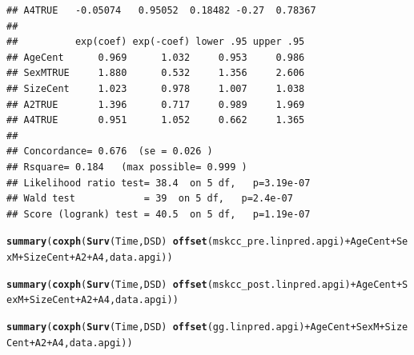 \documentclass{article}\usepackage[]{graphicx}\usepackage[]{color}
\makeatletter
\newcommand{\hlopt}[1]{\textcolor[rgb]{0,0,0}{#1}}%
\newcommand{\hlstd}[1]{\textcolor[rgb]{0.345,0.345,0.345}{#1}}%
\newcommand{\hlkwd}[1]{\textcolor[rgb]{0.737,0.353,0.396}{\textbf{#1}}}%
\newenvironment{kframe}{%
 \def\at@end@of@kframe{}%
 \ifinner\ifhmode%
  \def\at@end@of@kframe{\end{minipage}}%
  \begin{minipage}{\columnwidth}%
 \fi\fi%
 \def\FrameCommand##1{\hskip\@totalleftmargin \hskip-\fboxsep
 \colorbox{shadecolor}{##1}\hskip-\fboxsep
     \hskip-\linewidth \hskip-\@totalleftmargin \hskip\columnwidth}%
 \MakeFramed {\advance\hsize-\width
   \@totalleftmargin\z@ \linewidth\hsize
   \@setminipage}}%
 {\par\unskip\endMakeFramed%
 \at@end@of@kframe}
\newenvironment{knitrout}{}{} %
\makeatother
\begin{document}
\begin{knitrout}
\begin{kframe}
\begin{verbatim}
## A4TRUE   -0.05074   0.95052  0.18482 -0.27  0.78367
## 
##          exp(coef) exp(-coef) lower .95 upper .95
## AgeCent      0.969      1.032     0.953     0.986
## SexMTRUE     1.880      0.532     1.356     2.606
## SizeCent     1.023      0.978     1.007     1.038
## A2TRUE       1.396      0.717     0.989     1.969
## A4TRUE       0.951      1.052     0.662     1.365
## 
## Concordance= 0.676  (se = 0.026 )
## Rsquare= 0.184   (max possible= 0.999 )
## Likelihood ratio test= 38.4  on 5 df,   p=3.19e-07
## Wald test            = 39  on 5 df,   p=2.4e-07
## Score (logrank) test = 40.5  on 5 df,   p=1.19e-07
\end{verbatim}
\begin{alltt}
\hlkwd{summary}\hlstd{(}\hlkwd{coxph}\hlstd{(}\hlkwd{Surv}\hlstd{(Time, DSD)} \hlopt{~} \hlkwd{offset}\hlstd{(mskcc_pre.linpred.apgi)} \hlopt{+} \hlstd{AgeCent} \hlopt{+} \hlstd{SexM} \hlopt{+} \hlstd{SizeCent} \hlopt{+} \hlstd{A2} \hlopt{+} \hlstd{A4, data.apgi))}
\end{alltt}


{\ttfamily\noindent\color{warningcolor}{\#\# Warning in fitter(X, Y, strats, offset, init, control, weights = weights, : Ran out of iterations and did not converge}}

{\ttfamily\noindent\bfseries\color{errorcolor}{\#\# Error in fitter(X, Y, strats, offset, init, control, weights = weights, : NA/NaN/Inf in foreign function call (arg 6)}}\begin{alltt}
\hlkwd{summary}\hlstd{(}\hlkwd{coxph}\hlstd{(}\hlkwd{Surv}\hlstd{(Time, DSD)} \hlopt{~} \hlkwd{offset}\hlstd{(mskcc_post.linpred.apgi)} \hlopt{+} \hlstd{AgeCent} \hlopt{+} \hlstd{SexM} \hlopt{+} \hlstd{SizeCent} \hlopt{+} \hlstd{A2} \hlopt{+} \hlstd{A4, data.apgi))}
\end{alltt}


{\ttfamily\noindent\color{warningcolor}{\#\# Warning in fitter(X, Y, strats, offset, init, control, weights = weights, : Ran out of iterations and did not converge}}

{\ttfamily\noindent\bfseries\color{errorcolor}{\#\# Error in fitter(X, Y, strats, offset, init, control, weights = weights, : NA/NaN/Inf in foreign function call (arg 6)}}\begin{alltt}
\hlkwd{summary}\hlstd{(}\hlkwd{coxph}\hlstd{(}\hlkwd{Surv}\hlstd{(Time, DSD)} \hlopt{~} \hlkwd{offset}\hlstd{(gg.linpred.apgi)} \hlopt{+} \hlstd{AgeCent} \hlopt{+} \hlstd{SexM} \hlopt{+} \hlstd{SizeCent} \hlopt{+} \hlstd{A2} \hlopt{+} \hlstd{A4, data.apgi))}
\end{alltt}



\end{kframe}
\end{knitrout}
\end{document}
